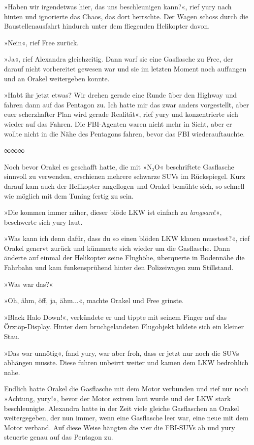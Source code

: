 »Haben wir irgendetwas hier, das uns beschleunigen kann?«, rief yury nach hinten und ignorierte das Chaos, das dort herrschte. Der Wagen schoss durch die Baustellenausfahrt hindurch unter dem fliegenden Helikopter davon.

»Nein«, rief Free zurück.

»Ja«, rief Alexandra gleichzeitig. Dann warf sie eine Gasflasche zu Free, der darauf nicht vorbereitet gewesen war und sie im letzten Moment noch auffangen und an Orakel weitergeben konnte.

»Habt ihr jetzt etwas? Wir drehen gerade eine Runde über den Highway und fahren dann auf das Pentagon zu. Ich hatte mir das zwar anders vorgestellt, aber euer scherzhafter Plan wird gerade Realität«, rief yury und konzentrierte sich wieder auf das Fahren. Die FBI-Agenten waren nicht mehr in Sicht, aber er wollte nicht in die Nähe des Pentagons fahren, bevor das FBI wiederauftauchte.

\begin{center}
	∞∞∞
\end{center}

Noch bevor Orakel es geschafft hatte, die mit »N₂O« beschriftete Gasflasche sinnvoll zu verwenden, erschienen mehrere schwarze SUVs im Rückspiegel. Kurz darauf kam auch der Helikopter angeflogen und Orakel bemühte sich, so schnell wie möglich mit dem Tuning fertig zu sein.

»Die kommen immer näher, dieser blöde LKW ist einfach zu \emph{langsam}!«, beschwerte sich yury laut.

»Was kann ich denn dafür, dass du so einen blöden LKW klauen musstest?«, rief Orakel genervt zurück und kümmerte sich wieder um die Gasflasche. Dann änderte auf einmal der Helikopter seine Flughöhe, überquerte in Bodennähe die Fahrbahn und kam funkensprühend hinter den Polizeiwagen zum Stillstand.

»Was war das?«

»Oh, ähm, öff, ja, ähm...«, machte Orakel und Free grinste.

»Black Halo Down!«, verkündete er und tippte mit seinem Finger auf das Örztöp-Display. Hinter dem bruchgelandeten Flugobjekt bildete sich ein kleiner Stau.

»Das war unnötig«, fand yury, war aber froh, dass er jetzt nur noch die SUVs abhängen musste. Diese fuhren unbeirrt weiter und kamen dem LKW bedrohlich nahe.

Endlich hatte Orakel die Gasflasche mit dem Motor verbunden und rief nur noch »Achtung, yury!«, bevor der Motor extrem laut wurde und der LKW stark beschleunigte. Alexandra hatte in der Zeit viele gleiche Gasflaschen an Orakel weitergegeben, der nun immer, wenn eine Gasflasche leer war, eine neue mit dem Motor verband. Auf diese Weise hängten die vier die FBI-SUVs ab und yury steuerte genau auf das Pentagon zu.

